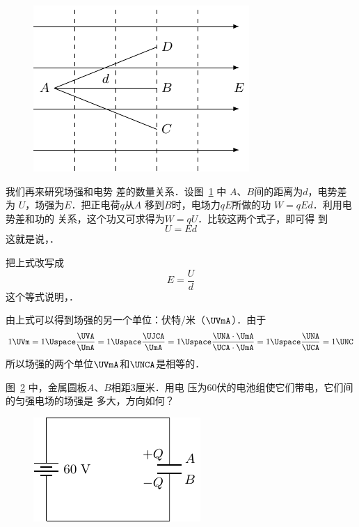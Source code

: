 \begin{figure}[htbp]
	\centering
	\includegraphics{fig/B/6-24.pdf}
	\caption{}\label{fig_B_6-24}
\end{figure}



我们再来研究场强和电势
差的数量关系．设图~\ref{fig_B_6-24} 中
$A$、$B$间的距离为$d$，电势差为
$U$，场强为$E$．把正电荷$q$从$A$
移到$B$时，电场力$qE$所做的功
$W=qEd$．利用电势差和功的
关系，这个功又可求得为$W=qU$．比较这两个式子，即可得
到
\[U=Ed\]
这就是说，．

把上式改写成
\[E=\frac{U}{d} \]
这个等式说明，．

由上式可以得到场强的另一个单位：伏特/米（$\UVmA$）．由于
\[1 \UVm = 1 \Uspace \frac{\UVA}{\UmA}=1\Uspace\frac{\UJCA}{\UmA}=1\Uspace\frac{\UNA\cdot \UmA}{\UCA\cdot \UmA}=1\Uspace\frac{\UNA}{\UCA} =1 \UNC  \]
所以场强的两个单位$\UVmA$和$\UNCA$是相等的．

\begin{example}
    图~\ref{fig_B_6-25} 中，金属圆板$A$、$B$相距3厘米．用电
压为60伏的电池组使它们带电，它们间的匀强电场的场强是
多大，方向如何？
\end{example}
\begin{figure}[htbp]
    \centering
    \includegraphics{fig/B/6-25.pdf}
    \caption{}\label{fig_B_6-25}
\end{figure}    

